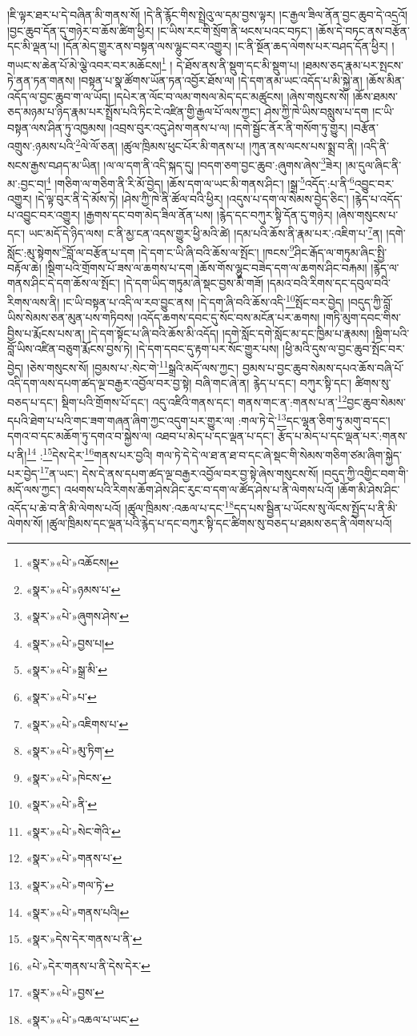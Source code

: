 །ཇི་ལྟར་ཐར་པ་དེ་བཞིན་མི་གནས་སོ། །དེ་ནི་རྙོང་གིས་སྤྲེའུ་ལ་དམ་བྱས་ལྟར། །ང་རྒྱལ་ཟིལ་ནོན་བྱང་ཆུབ་དེ་འདྲའོ། །བྱང་ཆུབ་དོན་དུ་གཉེར་བ་ཆོས་ཚིག་ཕྱིར། །ང་ཡིས་རང་གི་སྲོག་ནི་ཕངས་པའང་བཏང་། །ཆོས་དེ་བཏང་ནས་བརྩོན་དང་མི་ལྡན་པ། །དོན་མེད་གྱུར་ནས་བསྟན་ལས་ལྷུང་བར་འགྱུར། །ང་ནི་སྔོན་ཆད་ལེགས་པར་བཤད་དོན་ཕྱིར། །གཡང་ས་ཆེན་པོ་མེ་ལྕེ་འབར་བར་མཆོངས།\footnote{«སྣར་»«པེ་»འཆོངས།} །
དེ་ཐོས་ནས་ནི་སྡུག་དང་མི་སྡུག་པ། །ཐམས་ཅད་རྣམ་པར་སྤངས་ཏེ་ནན་ཏན་གནས། །བསྟན་པ་སྣ་ཚོགས་ཡོན་ཏན་འབྱོར་ཐོས་ལ། །དེ་དག་ནམ་ཡང་འདོད་པ་མི་སྐྱེ་ན། །ཆོས་མིན་འདོད་ལ་བྱང་ཆུབ་ག་ལ་ཡོད། །དཔེར་ན་ལོང་བ་ལམ་གསལ་མེད་དང་མཚུངས། །ཞེས་གསུངས་སོ། །ཆོས་ཐམས་ཅད་མཉམ་པ་ཉིད་རྣམ་པར་སྤྲོས་པའི་ཏིང་ངེ་འཛིན་གྱི་རྒྱལ་པོ་ལས་ཀྱང་། ཤེས་ཀྱི་ཁེ་ཡིས་བསླུས་པ་དག །ང་ཡི་བསྟན་ལས་ཤིན་ཏུ་འཁྱམས། །འབྲས་བུར་འདུ་ཤེས་གནས་པ་ལ། །དགེ་སྦྱོང་ནོར་ནི་གསོག་ཏུ་གྱུར། །བརྩོན་འགྲུས་:ཉམས་པའི་\footnote{«སྣར་»«པེ་»ཉམས་པ་}ལེ་ལོ་ཅན། །ཚུལ་ཁྲིམས་ཕུང་པོར་མི་གནས་པ། །ཀུན་ནས་ལངས་པས་སྨྲ་བ་ནི། །འདི་ནི་སངས་རྒྱས་བཤད་མ་ཡིན། །ལ་ལ་དག་ནི་འདི་སྐད་དུ། །བདག་ཅག་བྱང་ཆུབ་:ཞུགས་ཞེས་\footnote{«སྣར་»«པེ་»ཞུགས་ཤེས་}ཟེར། །མ་དུལ་ཞིང་ནི་མ་:བྱང་བ།\footnote{«སྣར་»«པེ་»བྱས་པ།} །གཅིག་ལ་གཅིག་ནི་རི་མོ་བྱེད། །ཆོས་དག་ལ་ཡང་མི་གནས་ཤིང་། །སྒྲ་\footnote{«སྣར་»«པེ་»སྒྲ་མི་}འདོད་:པ་ནི་\footnote{«སྣར་»«པེ་»པ་}འབྱུང་བར་འགྱུར། །དེ་ལྟ་བུར་ནི་དེ་མོས་ཏེ། །ཤེས་ཀྱི་ཁེ་ནི་ཚོལ་བའི་ཕྱིར། །འདུས་པ་དག་ལ་སེམས་བྱེད་ཅིང་། །རྙེད་པ་འདོད་པ་འབྱུང་བར་འགྱུར། །རྒྱགས་དང་བག་མེད་ཟིལ་ནོན་པས། །རྙེད་དང་བཀུར་སྟི་དོན་དུ་གཉེར། །ཞེས་གསུངས་པ་དང་། ཡང་མདོ་དེ་ཉིད་ལས། ང་ནི་མྱ་ངན་འདས་གྱུར་ཕྱི་མའི་ཚེ། །དམ་པའི་ཆོས་ནི་རྣམ་པར་:འཇིག་པ་\footnote{«སྣར་»«པེ་»འཇིགས་པ་}ན། །དགེ་སློང་:མུ་སྟེགས་\footnote{«སྣར་»«པེ་»མུ་ཏིག་}བློ་ལ་བརྩོན་པ་དག །དེ་དག་ང་ཡི་ཞི་བའི་ཆོས་ལ་སྤོང་། །ཁངས་\footnote{«སྣར་»«པེ་»ཁེངས་}ཤིང་རྒོད་ལ་གཏུམ་ཞིང་སྤྱི་བརྟོལ་ཆེ། །སྡིག་པའི་གྲོགས་པོ་ཟས་ལ་ཆགས་པ་དག །ཆོས་གོས་ལྷུང་བཟེད་དག་ལ་ཆགས་ཤིང་བརྐམ། །རྙེད་ལ་གནས་ཤིང་དེ་དག་ཆོས་ལ་སྤོང་། །དེ་དག་ཡིད་གཏུམ་ཞེ་སྡང་བྱས་མི་གཟོ། །དམའ་བའི་རིགས་དང་དབུལ་བའི་རིགས་ལས་ནི། །ང་ཡི་བསྟན་པ་འདི་ལ་རབ་བྱུང་ནས། །དེ་དག་ཞི་བའི་ཆོས་འདི་\footnote{«སྣར་»«པེ་»ནི་}སྤོང་བར་བྱེད། །བདུད་ཀྱི་བློ་ཡིས་སེམས་ཅན་མུན་པས་གཏིབས། །འདོད་ཆགས་དབང་དུ་སོང་བས་མངོན་པར་ཆགས། །གཏི་མུག་དབང་གིས་བྱིས་པ་རྨོངས་པས་ན། །དེ་དག་སྟོང་པ་ཞི་བའི་ཆོས་མི་འདོད། །དགེ་སློང་དགེ་སློང་མ་དང་ཁྱིམ་པ་རྣམས། །སྡིག་པའི་བློ་ཡིས་འཛིན་བཅུག་རྨོངས་བྱས་ཏེ། །དེ་དག་དབང་དུ་རྟག་པར་སོང་གྱུར་པས། །ཕྱི་མའི་དུས་ལ་བྱང་ཆུབ་སྤོང་བར་བྱེད། །ཅེས་གསུངས་སོ། །བྱམས་པ་:སེང་གེ་\footnote{«སྣར་»«པེ་»སེང་གེའི་}སྒྲའི་མདོ་ལས་ཀྱང་། བྱམས་པ་བྱང་ཆུབ་སེམས་དཔའ་ཆོས་བཞི་པོ་འདི་དག་ལས་དཔག་ཚད་ལྔ་བརྒྱར་འབྱོལ་བར་བྱ་སྟེ། བཞི་གང་ཞེ་ན། རྙེད་པ་དང་། བཀུར་སྟི་དང་། ཚིགས་སུ་བཅད་པ་དང་། སྡིག་པའི་གྲོགས་པོ་དང་། འདུ་འཛིའི་གནས་དང་། གནས་གང་ན་:གནས་པ་ན་\footnote{«སྣར་»«པེ་»གནས་པ་}བྱང་ཆུབ་སེམས་དཔའི་ཐེག་པ་པའི་གང་ཟག་གཞན་ཞིག་ཀྱང་འདུག་པར་གྱུར་ལ། :གལ་ཏེ་དེ་\footnote{«སྣར་»«པེ་»གལ་ཏེ་}དང་ལྷན་ཅིག་ཏུ་མགུ་བ་དང་། དགའ་བ་དང་མཆོག་ཏུ་དགའ་བ་སྐྱེས་ལ། འཐབ་པ་མེད་པ་དང་ལྡན་པ་དང་། རྩོད་པ་མེད་པ་དང་ལྡན་པར་:གནས་པ་ནི།\footnote{«སྣར་»«པེ་»གནས་པའི།} :\footnote{«སྣར་»དེས་དེར་གནས་པ་ནི་}དེས་དེར་\footnote{«པེ་»དེར་གནས་པ་ནི་དེས་དེར་}གནས་པར་བྱའི། གལ་ཏེ་དེ་དེ་ལ་ཐ་ན་ཐ་བ་དང་ཞེ་སྡང་གི་སེམས་གཅིག་ཙམ་ཞིག་སྐྱེད་པར་བྱེད་\footnote{«སྣར་»«པེ་»བྱས་}ན་ཡང་། དེས་དེ་ནས་དཔག་ཚད་ལྔ་བརྒྱར་འབྱོལ་བར་བྱ་སྟེ་ཞེས་གསུངས་སོ། །བདུད་ཀྱི་འགྱིང་བག་གི་མདོ་ལས་ཀྱང་། འཕགས་པའི་རིགས་ཆོག་ཤེས་ཤིང་རུང་བ་དག་ལ་ཚོད་ཤེས་པ་ནི་ལེགས་པའོ། །ཆོག་མི་ཤེས་ཤིང་འདོད་པ་ཆེ་བ་ནི་མི་ལེགས་པའོ། །ཚུལ་ཁྲིམས་:འཆལ་པ་དང་\footnote{«སྣར་»«པེ་»འཆལ་པ་ཡང་}དད་པས་སྦྱིན་པ་ཡོངས་སུ་ལོངས་སྤྱོད་པ་ནི་མི་ལེགས་སོ། །ཚུལ་ཁྲིམས་དང་ལྡན་པའི་རྙེད་པ་དང་བཀུར་སྟི་དང་ཚིགས་སུ་བཅད་པ་ཐམས་ཅད་ནི་ལེགས་པའོ། 